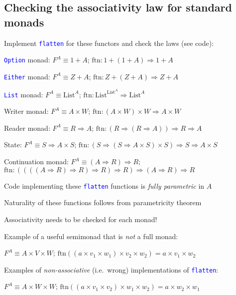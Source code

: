 \subsection{Checking the associativity law for standard monads}

Implement \texttt{\textcolor{blue}{\footnotesize{}flatten}} for these
functors and check the laws (see code):

\texttt{\textcolor{blue}{\footnotesize{}Option}} monad: $F^{A}\equiv1+A$;
$\text{ftn}:1+\left(1+A\right)\Rightarrow1+A$

\texttt{\textcolor{blue}{\footnotesize{}Either}} monad: $F^{A}\equiv Z+A$;
$\text{ftn}:Z+\left(Z+A\right)\Rightarrow Z+A$

\texttt{\textcolor{blue}{\footnotesize{}List}} monad: $F^{A}\equiv\text{List}^{A}$;
$\text{ftn}:\text{List}^{\text{List}^{A}}\Rightarrow\text{List}^{A}$

Writer monad: $F^{A}\equiv A\times W$; $\text{ftn}:\left(A\times W\right)\times W\Rightarrow A\times W$

Reader monad: $F^{A}\equiv R\Rightarrow A$; $\text{ftn}:\left(R\Rightarrow\left(R\Rightarrow A\right)\right)\Rightarrow R\Rightarrow A$

State: $F^{A}\equiv S\Rightarrow A\times S$; $\text{ftn}:\left(S\Rightarrow\left(S\Rightarrow A\times S\right)\times S\right)\Rightarrow S\Rightarrow A\times S$

Continuation monad: $F^{A}\equiv\left(A\Rightarrow R\right)\Rightarrow R$;
$\text{ftn}:\left(\left(\left(\left(A\Rightarrow R\right)\Rightarrow R\right)\Rightarrow R\right)\Rightarrow R\right)\Rightarrow\left(A\Rightarrow R\right)\Rightarrow R$

Code implementing these \texttt{\textcolor{blue}{\footnotesize{}flatten}}
functions is \emph{fully parametric} in $A$

Naturality of these functions follows from parametricity theorem

Associativity needs to be checked for each monad!

Example of a useful semimonad that is \emph{not} a full monad:

$F^{A}\equiv A\times V\times W$; $\text{ftn}\left(\left(a\times v_{1}\times w_{1}\right)\times v_{2}\times w_{2}\right)=a\times v_{1}\times w_{2}$

Examples of \emph{non-associative} (i.e.\ wrong) implementations
of \texttt{\textcolor{blue}{\footnotesize{}flatten}}:

$F^{A}\equiv A\times W\times W$; $\text{ftn}\left(\left(a\times v_{1}\times v_{2}\right)\times w_{1}\times w_{2}\right)=a\times w_{2}\times w_{1}$

